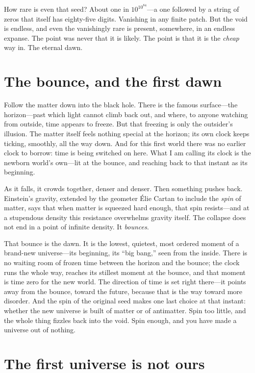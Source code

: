 How rare is even that seed? About one in $10^{10^{84}}$---a one followed by a
string of zeros that itself has eighty-five digits. Vanishing in any finite patch.
But the void is endless, and even the vanishingly rare is present, somewhere, in
an endless expanse. The point was never that it is likely. The point is that it is
the \emph{cheap} way in. The eternal dawn.

\section*{The bounce, and the first dawn}

Follow the matter down into the black hole. There is the famous surface---the
horizon---past which light cannot climb back out, and where, to anyone watching
from outside, time appears to freeze. But that freezing is only the outsider's
illusion. The matter itself feels nothing special at the horizon; its own clock
keeps ticking, smoothly, all the way down. And for this first world there was no
earlier clock to borrow: time is being switched on here. What I am calling its
clock is the newborn world's own---lit at the bounce, and reaching back to that
instant as its beginning.

As it falls, it crowds together, denser and denser. Then something pushes back.
Einstein's gravity, extended by the geometer \'Elie Cartan to include the
\emph{spin} of matter, says that when matter is squeezed hard enough, that spin
resists---and at a stupendous density this resistance overwhelms gravity itself.
The collapse does not end in a point of infinite density. It \emph{bounces}.

That bounce is the dawn. It is the lowest, quietest, most ordered moment of a
brand-new universe---its beginning, its ``big bang,'' seen from the inside. There
is no waiting room of frozen time between the horizon and the bounce; the clock
runs the whole way, reaches its stillest moment at the bounce, and that moment is
time zero for the new world. The direction of time is set right there---it points
away from the bounce, toward the future, because that is the way toward more
disorder. And the spin of the original seed makes one last choice at that instant:
whether the new universe is built of matter or of antimatter. Spin too little, and
the whole thing fizzles back into the void. Spin enough, and you have made a
universe out of nothing.

\section*{The first universe is not ours}

